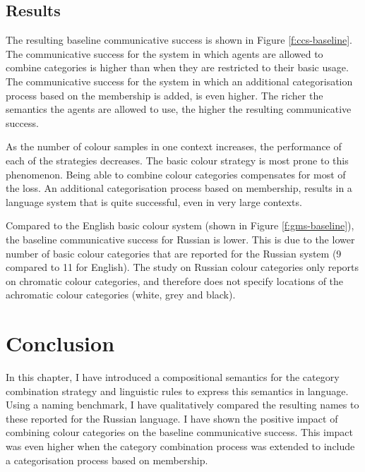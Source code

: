 \subsection{Results}

The resulting baseline communicative success is shown in Figure
\ref{f:ccs-baseline}. The communicative success for the system in
which agents are allowed to combine categories is higher than when
they are restricted to their basic usage. The communicative success
for the system in which an additional categorisation process based on
the membership is added, is even higher. The richer the semantics the
agents are allowed to use, the higher the resulting communicative
success.

As the number of colour samples in one context increases, the
performance of each of the strategies decreases. The basic
  colour strategy is most prone to this phenomenon. Being able to
combine colour categories compensates for most of the loss. An
additional categorisation process based on membership, results in a
language system that is quite successful, even in very large contexts.

Compared to the English basic colour system (shown in Figure
\ref{f:gms-baseline}), the baseline communicative success for Russian
is lower. This is due to the lower number of basic colour categories
that are reported for the Russian system (9 compared to 11 for
English). The study on Russian colour categories only reports on
chromatic colour categories, and therefore does not specify locations
of the achromatic colour categories (white, grey and black).


\section{Conclusion}

In this chapter, I have introduced a compositional semantics for the
category combination strategy and linguistic rules to express
this semantics in language. Using a naming benchmark, I have
qualitatively compared the resulting names to these reported for the
Russian language. I have shown the positive impact of combining
colour categories on the baseline communicative success. This impact
was even higher when the category combination process was extended
to include a categorisation process based on membership.

\newpage
\thispagestyle{empty}
